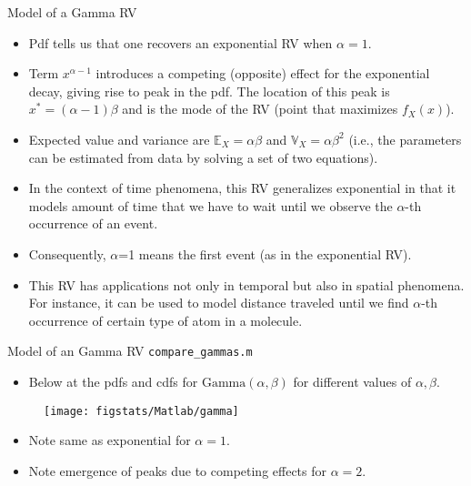 \documentclass[handout,9pt]{beamer}
\begin{document}
%
\begin{frame}{Model of a Gamma RV}

\begin{itemize}
\setlength{\itemsep}{10pt}
\item Pdf tells us that one recovers an exponential RV when $\alpha=1$. 
\item Term $x^{\alpha-1}$ introduces a competing (opposite) effect for the exponential decay, giving rise to peak in the pdf. The location of this peak is $x^*=(\alpha-1)\beta$ and is the mode of the RV (point that maximizes $f_X(x)$). 
\item Expected value and variance are $\mathbb{E}_X=\alpha\beta$ and $\mathbb{V}_X=\alpha\beta^2$ (i.e., the parameters can be estimated from data by solving a set of two equations). 
\item In the context of time phenomena, this RV generalizes exponential in that it models amount of time that we have to wait until we observe the $\alpha$-th occurrence of an event. 
\item Consequently, $\alpha$=1 means the first event (as in the exponential RV). 
\item This RV has applications not only in temporal but also in spatial phenomena. For instance, it can be used to model distance traveled until we find $\alpha$-th occurrence of certain type of atom in a molecule.  
\end{itemize}

\end{frame}


%
\begin{frame}{Model of an Gamma RV \footnotesize{\texttt{compare\_gammas.m}}}
\begin{itemize}
\setlength{\itemsep}{10pt}
\item Below at the pdfs and cdfs for $\textrm{Gamma}(\alpha,\beta)$ for different values of $\alpha,\beta$.
\end{itemize}
\begin{figure}[!htb]
    \centering
	\texttt{[image: figstats/Matlab/gamma]}
\end{figure}
\begin{itemize}
\setlength{\itemsep}{10pt}
\item Note same as exponential for $\alpha=1$.
\item Note emergence of peaks due to competing effects for $\alpha=2$. 
\end{itemize}
\end{frame}
\end{document}
